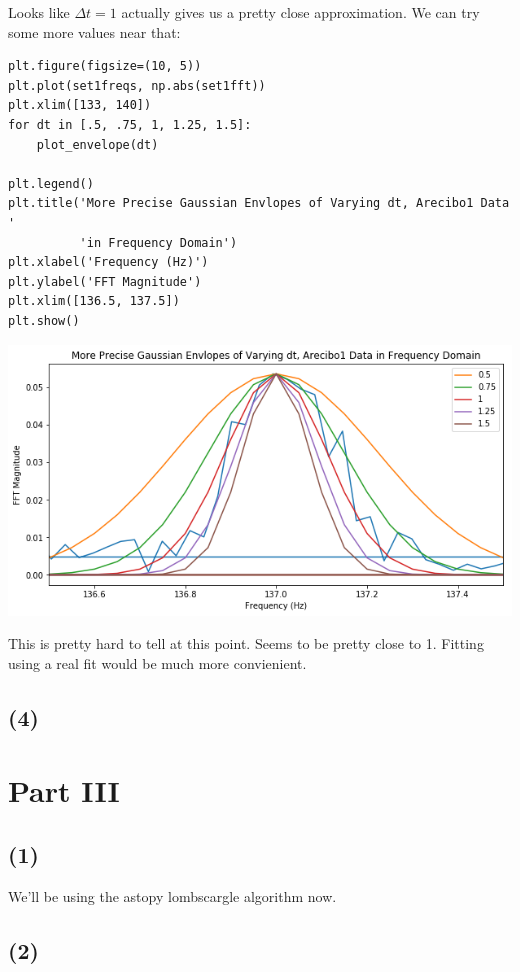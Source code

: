 \documentclass[11pt]{article}
\begin{document}
Looks like $\Delta t = 1$ actually gives us a pretty close approximation. We
can try some more values near that:

\begin{verbatim}
plt.figure(figsize=(10, 5))
plt.plot(set1freqs, np.abs(set1fft))
plt.xlim([133, 140])
for dt in [.5, .75, 1, 1.25, 1.5]:
    plot_envelope(dt)

plt.legend()
plt.title('More Precise Gaussian Envlopes of Varying dt, Arecibo1 Data '
          'in Frequency Domain') 
plt.xlabel('Frequency (Hz)')
plt.ylabel('FFT Magnitude')
plt.xlim([136.5, 137.5])
plt.show()
\end{verbatim}

\includegraphics[width=.9\linewidth]{./obipy-resources/333Rzr.png}

This is pretty hard to tell at this point. Seems to be pretty close
to 1. Fitting using a real fit would be much more convienient.

\subsection*{(4)}
\label{sec-2-3}

\section*{Part III}
\label{sec-3}

\subsection*{(1)}
\label{sec-3-1}

We'll be using the astopy lombscargle algorithm now.

\subsection*{(2)}
\label{sec-3-2}
\end{document}
